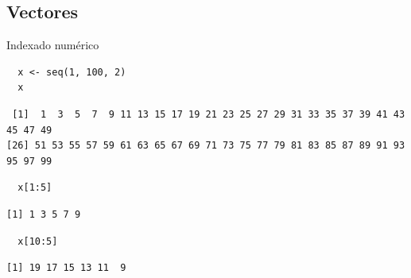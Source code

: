 \documentclass[xcolor={usenames,svgnames,dvipsnames}]{beamer}
\begin{document}
\subsection{Vectores}
\label{sec-3-2}
\begin{frame}[fragile,label=sec-3-2-1]{Indexado numérico}
 \lstset{language=R,label= ,caption= ,numbers=none}
\begin{lstlisting}
  x <- seq(1, 100, 2)
  x
\end{lstlisting}

\begin{verbatim}
 [1]  1  3  5  7  9 11 13 15 17 19 21 23 25 27 29 31 33 35 37 39 41 43 45 47 49
[26] 51 53 55 57 59 61 63 65 67 69 71 73 75 77 79 81 83 85 87 89 91 93 95 97 99
\end{verbatim}

\lstset{language=R,label= ,caption= ,numbers=none}
\begin{lstlisting}
  x[1:5]
\end{lstlisting}

\begin{verbatim}
[1] 1 3 5 7 9
\end{verbatim}

\lstset{language=R,label= ,caption= ,numbers=none}
\begin{lstlisting}
  x[10:5]
\end{lstlisting}

\begin{verbatim}
[1] 19 17 15 13 11  9
\end{verbatim}
\end{frame}
\end{document}
